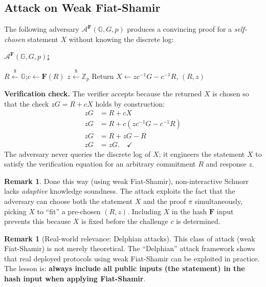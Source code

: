 \documentclass[11pt]{article}
\theoremstyle{plain}
\theoremstyle{definition}
\newtheorem{remark}[theorem]{Remark}
\newcommand{\Z}{\mathbb{Z}}
\newcommand{\G}{\mathbb{G}}
\newcommand{\samplefrom}{\xleftarrow{\$}}
\newcommand{\Adv}{\mathcal{A}}
\newcommand{\RO}{\mathbf{F}}   %
\begin{document}
\subsection{Attack on Weak Fiat-Shamir}

\begin{tcolorbox}[title={Attack on WFSSchnorr (forging a proof without knowing $x$)},
                  colback=red!5, colframe=red!50!black]
The following adversary $\Adv^{\RO}(\G, G, p)$ produces a convincing proof
for a \emph{self-chosen} statement $X$ without knowing the discrete log:

\medskip
\textbf{\underline{$\Adv^{\RO}(\G, G, p)$:}}
\begin{algorithmic}[1]
  \State $R \samplefrom \G$;\quad $c \leftarrow \RO(R)$
  \State $z \samplefrom \Z_p$
  \State Return $X \leftarrow zc^{-1}G - c^{-1}R$, \quad $(R, z)$
\end{algorithmic}
\end{tcolorbox}

\noindent\textbf{Verification check.}
The verifier accepts because the returned $X$ is chosen so that the check
$zG = R + cX$ holds by construction:
\begin{align*}
  zG &= R + cX \\
  zG &= R + c(zc^{-1}G - c^{-1}R) \\
  zG &= R + zG - R \\
  zG &= zG. \quad\checkmark
\end{align*}
The adversary never queries the discrete log of $X$; it engineers the statement
$X$ to satisfy the verification equation for an arbitrary commitment $R$ and
response $z$.

\begin{remark}
Done this way (using weak Fiat-Shamir), non-interactive Schnorr lacks
\emph{adaptive} knowledge soundness.  The attack exploits the fact that
the adversary can choose both the statement $X$ and the proof $\pi$
simultaneously, picking $X$ to ``fit'' a pre-chosen $(R, z)$.  Including $X$
in the hash $\RO$ input prevents this because $X$ is fixed before the
challenge $c$ is determined.
\end{remark}

\begin{remark}[Real-world relevance: Delphian attacks]
This class of attack (weak Fiat-Shamir) is not merely theoretical.  The
``Delphian'' attack framework shows that real deployed protocols using weak
Fiat-Shamir can be exploited in practice.  The lesson is: \textbf{always
include all public inputs (the statement) in the hash input when applying
Fiat-Shamir}.
\end{remark}
\end{document}
